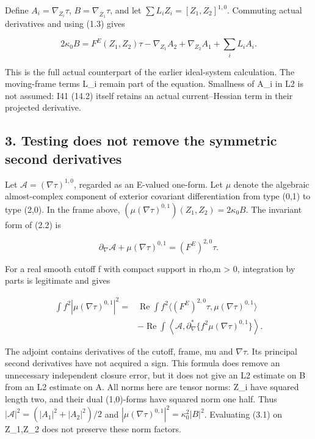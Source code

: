 \documentclass[
  10pt,
]{article}
\begin{document}
Define \(A_i=\nabla_{Z_i}\tau\), \(B=\nabla_{\overline Z_1}\tau\), and
let \(\sum L_iZ_i=[Z_1,Z_2]^{1,0}\). Commuting actual derivatives and
using (1.3) gives

\[
 \boxed{2\kappa_0 B=F^E(Z_1,Z_2)\tau
       -\nabla_{Z_1}A_2+\nabla_{Z_2}A_1+\sum_i L_iA_i.}   \tag{2.2}
\]

This is the full actual counterpart of the earlier ideal-system
calculation. The moving-frame terms L\_i remain part of the equation.
Smallness of A\_i in L2 is not assumed: I41 (14.2) itself retains an
actual current--Hessian term in their projected derivative.

\hypertarget{testing-does-not-remove-the-symmetric-second-derivatives}{%
\subsection{3. Testing does not remove the symmetric second
derivatives}\label{testing-does-not-remove-the-symmetric-second-derivatives}}

Let \(\mathcal A=(\nabla\tau)^{1,0}\), regarded as an E-valued one-form.
Let \(\mu\) denote the algebraic almost-complex component of exterior
covariant differentiation from type (0,1) to type (2,0). In the frame
above, \((\mu(\nabla\tau)^{0,1})(Z_1,Z_2)=2\kappa_0 B\). The invariant
form of (2.2) is

\[
 \partial_\nabla\mathcal A+\mu(\nabla\tau)^{0,1}
                         =(F^E)^{2,0}\tau.               \tag{3.1}
\]

For a real smooth cutoff f with compact support in rho,m \textgreater{}
0, integration by parts is legitimate and gives

\[
\begin{aligned}
 \int f^2|\mu(\nabla\tau)^{0,1}|^2
 ={}&\operatorname{Re}\int f^2
       \langle(F^E)^{2,0}\tau,\mu(\nabla\tau)^{0,1}\rangle\\
 &-\operatorname{Re}\int\left\langle\mathcal A,
       \partial_\nabla^*\{f^2\mu(\nabla\tau)^{0,1}\}\right\rangle.
\end{aligned}                                             \tag{3.2}
\]

The adjoint contains derivatives of the cutoff, frame, mu and
\(\nabla\tau\). Its principal second derivatives have not acquired a
sign. This formula does remove an unnecessary independent closure error,
but it does not give an L2 estimate on B from an L2 estimate on A. All
norms here are tensor norms: Z\_i have squared length two, and their
dual (1,0)-forms have squared norm one half. Thus
\(|\mathcal A|^2=(|A_1|^2+|A_2|^2)/2\) and
\(|\mu(\nabla\tau)^{0,1}|^2=\kappa_0^2|B|^2\). Evaluating (3.1) on
Z\_1,Z\_2 does not preserve these norm factors.
\end{document}
